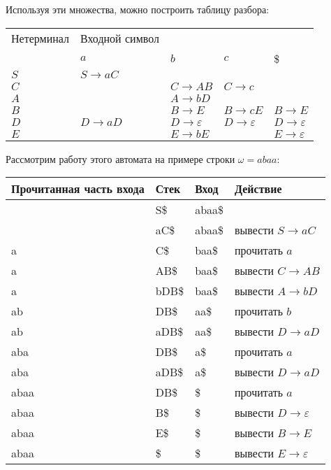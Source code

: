 \documentclass[11pt]{article}
\begin{document}
Используя эти множества, можно построить таблицу разбора:
\begin{center}
\begin{tabular}{lllll}
\hline
Нетерминал & Входной символ &  &  & \\
 & \(a\) & \(b\) & \(c\) & \$\\
\hline
\(S\) & \(S \rightarrow aC\) &  &  & \\
\(C\) &  & \(C \rightarrow AB\) & \(C \rightarrow c\) & \\
\(A\) &  & \(A \rightarrow bD\) &  & \\
\(B\) &  & \(B \rightarrow E\) & \(B \rightarrow cE\) & \(B \rightarrow E\)\\
\(D\) & \(D \rightarrow aD\) & \(D \rightarrow \varepsilon\) & \(D \rightarrow \varepsilon\) & \(D \rightarrow \varepsilon\)\\
\(E\) &  & \(E \rightarrow bE\) &  & \(E \rightarrow \varepsilon\)\\
\hline
\end{tabular}
\end{center}

Рассмотрим работу этого автомата на примере строки \(\omega = abaa\):
\begin{center}
\begin{tabular}{llll}
\hline
Прочитанная часть входа & Стек & Вход & Действие\\
\hline
 & S\$ & abaa\$ & \\
 & aC\$ & abaa\$ & вывести \(S \rightarrow aC\)\\
a & C\$ & baa\$ & прочитать \(a\)\\
a & AB\$ & baa\$ & вывести \(C \rightarrow AB\)\\
a & bDB\$ & baa\$ & вывести \(A \rightarrow bD\)\\
ab & DB\$ & aa\$ & прочитать \(b\)\\
ab & aDB\$ & aa\$ & вывести \(D \rightarrow aD\)\\
aba & DB\$ & a\$ & прочитать \(a\)\\
aba & aDB\$ & a\$ & вывести \(D \rightarrow aD\)\\
abaa & DB\$ & \$ & прочитать \(a\)\\
abaa & B\$ & \$ & вывести \(D \rightarrow \varepsilon\)\\
abaa & E\$ & \$ & вывести \(B \rightarrow E\)\\
abaa & \$ & \$ & вывести \(E \rightarrow \varepsilon\)\\
\hline
\end{tabular}
\end{center}
\end{document}
